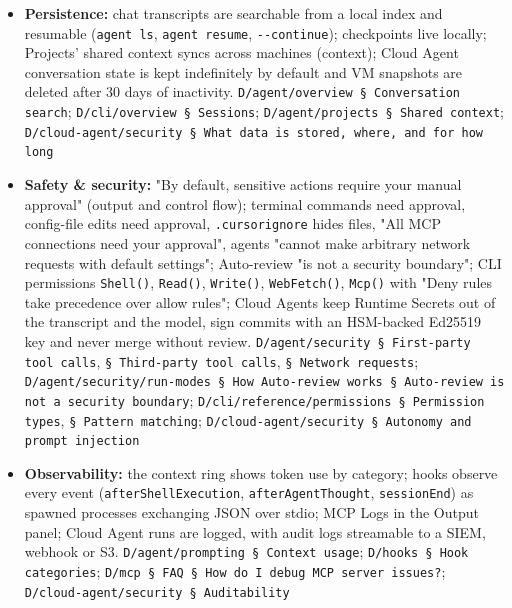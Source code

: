 \begin{itemize}
\item \textbf{Persistence:} chat transcripts are searchable from a local index and resumable (\texttt{agent ls}, \texttt{agent resume}, \texttt{-\allowbreak{}-\allowbreak{}continue}); checkpoints live locally; Projects' shared context syncs across machines (context); Cloud Agent conversation state is kept indefinitely by default and VM snapshots are deleted after 30 days of inactivity. \texttt{D/\allowbreak{}agent/\allowbreak{}overview § Conversation search}; \texttt{D/\allowbreak{}cli/\allowbreak{}overview § Sessions}; \texttt{D/\allowbreak{}agent/\allowbreak{}projects § Shared context}; \texttt{D/\allowbreak{}cloud-\allowbreak{}agent/\allowbreak{}security § What data is stored, where, and for how long}
\item \textbf{Safety \& security:} "By default, sensitive actions require your manual approval" (output and control flow); terminal commands need approval, config-file edits need approval, \texttt{.\allowbreak{}cursorignore} hides files, "All MCP connections need your approval", agents "cannot make arbitrary network requests with default settings"; Auto-review "is not a security boundary"; CLI permissions \texttt{Shell(\allowbreak{})}, \texttt{Read(\allowbreak{})}, \texttt{Write(\allowbreak{})}, \texttt{WebFetch(\allowbreak{})}, \texttt{Mcp(\allowbreak{})} with "Deny rules take precedence over allow rules"; Cloud Agents keep Runtime Secrets out of the transcript and the model, sign commits with an HSM-backed Ed25519 key and never merge without review. \texttt{D/\allowbreak{}agent/\allowbreak{}security § First-\allowbreak{}party tool calls}, \texttt{§ Third-\allowbreak{}party tool calls}, \texttt{§ Network requests}; \texttt{D/\allowbreak{}agent/\allowbreak{}security/\allowbreak{}run-\allowbreak{}modes § How Auto-\allowbreak{}review works § Auto-\allowbreak{}review is not a security boundary}; \texttt{D/\allowbreak{}cli/\allowbreak{}reference/\allowbreak{}permissions § Permission types}, \texttt{§ Pattern matching}; \texttt{D/\allowbreak{}cloud-\allowbreak{}agent/\allowbreak{}security § Autonomy and prompt injection}
\item \textbf{Observability:} the context ring shows token use by category; hooks observe every event (\texttt{afterShellExecution}, \texttt{afterAgentThought}, \texttt{sessionEnd}) as spawned processes exchanging JSON over stdio; MCP Logs in the Output panel; Cloud Agent runs are logged, with audit logs streamable to a SIEM, webhook or S3. \texttt{D/\allowbreak{}agent/\allowbreak{}prompting § Context usage}; \texttt{D/\allowbreak{}hooks § Hook categories}; \texttt{D/\allowbreak{}mcp § FAQ § How do I debug MCP server issues?}; \texttt{D/\allowbreak{}cloud-\allowbreak{}agent/\allowbreak{}security § Auditability}

\end{itemize}
